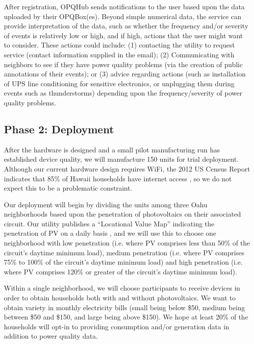 After registration, OPQHub sends notifications to the user based upon the data uploaded by their OPQBox(es).  Beyond simple numerical data, the service can provide interpretation of the data, such as whether the frequency and/or severity of events is relatively low or high, and if high, actions that the user might want to consider.  These actions could include: (1) contacting the utility to request service (contact information supplied in the email); (2) Communicating with neighbors to see if they have power quality problems (via the creation of public annotations of their events); or (3) advice regarding actions (such as installation of UPS line conditioning for sensitive electronics, or unplugging them during events such as thunderstorms) depending upon the frequency/severity of power quality problems.

\subsection{Phase 2: Deployment}

After the hardware is designed and a small pilot manufacturing run has established device quality, we will manufacture 150 units for trial deployment.  Although our current hardware design requires WiFi, the 2012 US Census Report indicates that 85\% of Hawaii households have internet access \cite{home-internet-access}, so we do not expect this to be a problematic constraint. 

Our deployment will begin by dividing the units among three Oahu neighborhoods based upon the penetration of photovoltaics on their associated circuit.  Our utility publishes a ``Locational Value Map'' indicating the penetration of PV on a daily basis \cite{lvm}, and we will use this to choose one neighborhood with low penetration (i.e. where PV comprises less than 50\% of the circuit's daytime minimum load), medium penetration (i.e. where PV comprises 75\% to 100\% of the circuit's daytime minimum load) and high penetration (i.e. where PV comprises 120\% or greater of the circuit's daytime minimum load). 

Within a single neighborhood, we will choose participants to receive devices in order to obtain households both with and without photovoltaics. We want to obtain variety in monthly electricity bills (small being below \$50, medium being between \$50 and \$150, and large being above \$150).  We hope at least 20\% of the households will opt-in to providing consumption and/or generation data in addition to power quality data. 

